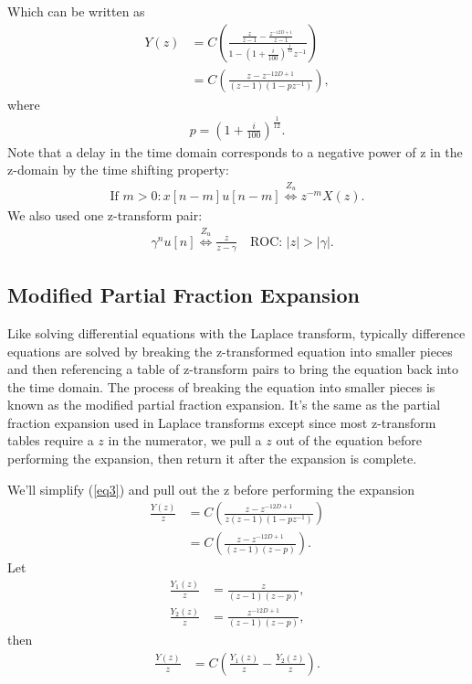 \documentclass[letterpaper]{article}
\begin{document}
Which can be written as
\begin{align}
	Y(z) &=  C\left(\frac{\frac{z}{z-1} - \frac{z^{-12D+1}}{z-1}}
	{1 - \left(1 + \frac{i}{100} \right)^{\frac{1}{12}}z^{-1}}\right) \\
	     &=  C\left(\frac{z - z^{-12D+1}}{(z-1)(1 - p z^{-1})}\right), \label{eq3}
\end{align}
where 
\begin{align}
	p = \left(1 + \frac{i}{100} \right)^{\frac{1}{12}}.
\end{align}
Note that a delay in the time domain corresponds to a negative power of z in the z-domain by the time shifting property:
\begin{align}
	\text{If }m>0: x[n-m]u[n-m] \stackrel{Z_u}{\Longleftrightarrow} z^{-m} X(z). \label{prop1}
\end{align}
We also used one z-transform pair:
\begin{align}
	&\gamma^nu[n] \stackrel{Z_u}{\Longleftrightarrow} \frac{z}{z-\gamma} \quad\text{ROC: } |z|>|\gamma|. \label{tp1}
\end{align}

\subsection{Modified Partial Fraction Expansion}
Like solving differential equations with the Laplace transform, typically difference equations are solved by breaking the z-transformed equation into smaller pieces and then referencing a table of z-transform pairs to bring the equation back into the time domain. The process of breaking the equation into smaller pieces is known as the modified partial fraction expansion. It's the same as the partial fraction expansion used in Laplace transforms except since most z-transform tables require a $z$ in the numerator, we pull a $z$ out of the equation before performing the expansion, then return it after the expansion is complete.

We'll simplify (\ref{eq3}) and pull out the z before performing the expansion
\begin{align}
	\frac{Y(z)}{z} &= C \left( \frac{z - z^{-12D+1}}{z(z-1)(1 - pz^{-1})} \right) \\
	&= C \left( \frac{z - z^{-12D+1}}{(z-1)(z - p)} \right).
\end{align}
Let
\begin{align}
	\frac{Y_1(z)}{z} &= \frac{z}{(z-1)(z - p)}, \\
	\frac{Y_2(z)}{z} &= \frac{z^{-12D+1}}{(z-1)(z - p)},
\end{align}
then
\begin{align}
	\frac{Y(z)}{z} &= C \left( \frac{Y_1(z)}{z} - \frac{Y_2(z)}{z} \right).
\end{align}
\end{document}
